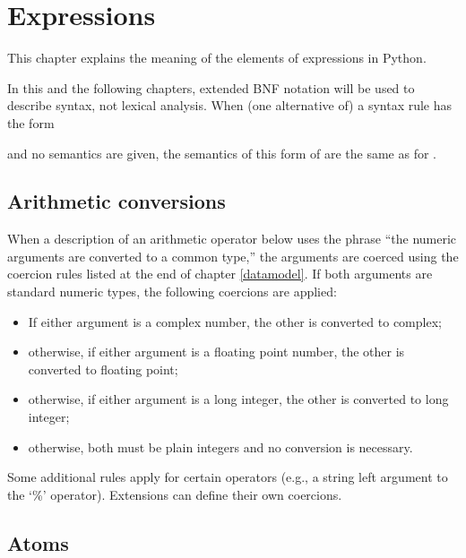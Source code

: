 \chapter{Expressions\label{expressions}}

This chapter explains the meaning of the elements of expressions in
Python.

 In this and the following chapters, extended
BNF notation will be used to describe syntax, not lexical
analysis.  When (one alternative of) a syntax rule has the form

\begin{productionlist}[*]
\end{productionlist}

and no semantics are given, the semantics of this form of 
are the same as for .


\section{Arithmetic conversions\label{conversions}}

When a description of an arithmetic operator below uses the phrase
``the numeric arguments are converted to a common type,'' the
arguments are coerced using the coercion rules listed at the end of
chapter \ref{datamodel}.  If both arguments are standard numeric
types, the following coercions are applied:

\begin{itemize}
\item	If either argument is a complex number, the other is converted
	to complex;
\item	otherwise, if either argument is a floating point number,
	the other is converted to floating point;
\item	otherwise, if either argument is a long integer,
	the other is converted to long integer;
\item	otherwise, both must be plain integers and no conversion
	is necessary.
\end{itemize}

Some additional rules apply for certain operators (e.g., a string left
argument to the `\%' operator). Extensions can define their own
coercions.


\section{Atoms\label{atoms}}

